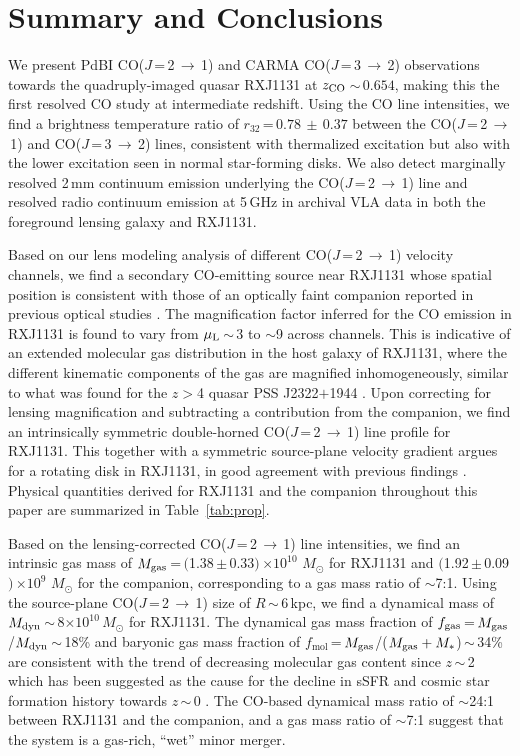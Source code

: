 \documentclass[]{emulateapj}
\newcommand{\Msun}{\mbox{$M_{\odot}$}\xspace}
\newcommand{\rarr}{$\rightarrow$}
\newcommand{\bco}{\mbox{CO($J$\,=\,2\,\rarr\,1)}\xspace}
\newcommand{\cco}{\mbox{CO($J$\,=\,3\,\rarr\,2)}\xspace}
\newcommand{\E}[1]{\mbox{$\times10^{#1}$}}
\newcommand{\eq}{\,=\,}
\newcommand{\ssim}{\,$\sim$\,}
\newcommand{\pmm}{\,$\pm$\,}
\newcommand{\Tab}[1]{Table~\ref{tab:#1}}
\newcommand{\SF}{star formation\xspace}
\begin{document}
\section{Summary and Conclusions} \label{sec:sum}
We present PdBI \bco and CARMA \cco observations towards the
quadruply-imaged quasar RXJ1131 at $z_{\rm CO}$\ssim$0.654$, making this the first
resolved CO study at intermediate redshift.
Using the CO line intensities, we find a brightness temperature ratio of $r_{32}$\eq$0.78\,\pm\,0.37$
between the \bco and \cco lines,
consistent with thermalized excitation but also with the lower excitation seen in normal star-forming disks.
We also detect marginally resolved
2\,mm continuum emission underlying the \bco line
and resolved radio continuum emission at 5\,GHz in archival VLA data
in both the foreground lensing galaxy and RXJ1131.

Based on our lens modeling analysis of different \bco velocity channels,
we find a secondary CO-emitting source near RXJ1131 whose spatial position
is consistent with those of an optically faint companion reported in previous optical studies
.
The magnification factor inferred for the CO emission in RXJ1131 is found to
vary from $\mu_{\rm L}$\ssim3 to $\sim$9 across channels. This is indicative of an extended molecular gas
distribution in the host galaxy of RXJ1131, where the different kinematic components
of the gas are magnified inhomogeneously, similar to what was found for the $z$$>$4 quasar
PSS J2322$+$1944 \citep{Riechers08a}.
Upon correcting for lensing magnification and subtracting a contribution from the companion,
we find an intrinsically symmetric double-horned \bco line profile for RXJ1131.
This together with a symmetric source-plane velocity gradient argues for a rotating disk in RXJ1131, in good agreement with previous findings . Physical quantities derived for RXJ1131 and the companion throughout this paper are summarized in \Tab{prop}.

Based on the lensing-corrected \bco line intensities,
we find an intrinsic gas mass of $M_{\rm gas}$\,=\,$($1.38\pmm0.33$)$\,\E{10} \Msun
for RXJ1131
and $($1.92\pmm0.09$)$\,\E{9} \Msun for the companion,
corresponding to a gas mass ratio of $\sim$7:1.
Using the source-plane \bco size of $R$\ssim6\,kpc, we find a dynamical mass of $M_{\rm dyn}$\ssim8\E{10}\,\Msun for RXJ1131.
The dynamical gas mass fraction of $f_{\rm gas}$\eq$M_{\rm gas}$/$M_{\rm dyn}$\ssim18\% and baryonic gas mass fraction of
$f_\textrm{mol}$\eq$M_{\rm gas}$/($M_{\rm gas} + M_*$)\ssim34\% are consistent with the trend of decreasing molecular gas
content since $z$\ssim2 \citep[e.g.,][;]{Lagos11a,Tacconi13a}
which has been suggested as the cause for the decline in sSFR and cosmic \SF history towards $z$\ssim0 \citep[e.g.,][]{Tacconi13a,CW13,Genzel15a}.
The CO-based dynamical mass ratio of $\sim$24:1
between RXJ1131 and the companion, and a gas mass ratio of $\sim$7:1
suggest that the system is a gas-rich, ``wet'' minor merger.
\end{document}
